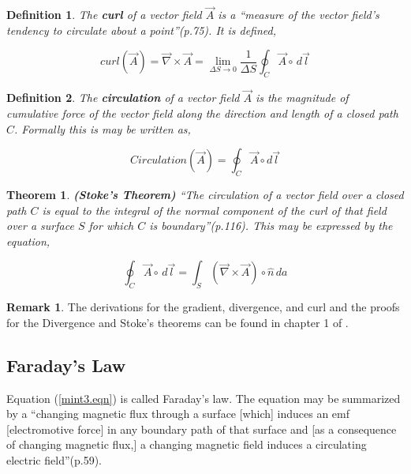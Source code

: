 \documentclass[12pt]{article}
\newtheorem{theorem}{Theorem}[section]
\newtheorem{definition}{Definition}[section]
\theoremstyle{definition}
\newtheorem*{remark}{Remark}
\numberwithin{equation}{section}
\begin{document}
\begin{definition}The \textbf{curl} of a vector field $\vec{A}$ is a \enquote{measure of the vector field's tendency to circulate about a point}(p.75)\cite{Flei}. It is defined,

\begin{equation}
curl(\vec{A})=\vec{\nabla}\times\vec{A}=\lim_{\Delta S\to 0}\frac{1}{\Delta S}\oint_{C}\vec{A}\circ\,d\vec{l}
\label{curl.eqn}
\end{equation}
\end{definition}

\begin{definition} The \textbf{circulation} of a vector field $\vec{A}$ is the magnitude of cumulative force of the vector field along the direction and length of a closed path $C$. Formally this is may be written as,

\begin{equation}
Circulation(\vec{A})=\oint_{C}\vec{A}\circ d\vec{l}
\label{circulation.eqn}
\end{equation}
\end{definition}


\begin{theorem} \textbf{(Stoke's Theorem)} \enquote{The circulation of a vector field over a closed path $C$ is equal to the integral of the normal component of the curl of that field over a surface $S$ for which $C$ is boundary}(p.116)\cite{Flei}. This may be expressed by the equation,

\begin{equation}
\oint_{C}\vec{A}\circ\,d\vec{l}=\int_{S}(\vec{\nabla}\times\vec{A})\circ\hat{n}\,da
\label{stokes.eqn}
\end{equation}
\end{theorem}

\begin{remark} 
The derivations for the gradient, divergence, and curl and the proofs for the Divergence and Stoke's theorems can be found in chapter 1 of \cite{Reitz}.
\end{remark}

\subsection{Faraday's Law}
Equation (\ref{mint3.eqn}) is called Faraday's law. The equation may be summarized by a \enquote{changing magnetic flux through a surface [which] induces an emf [electromotive force] in any boundary path of that surface and [as a consequence of changing magnetic flux,] a changing magnetic field induces a circulating electric field}(p.59)\cite{Flei}.\\
\end{document}

